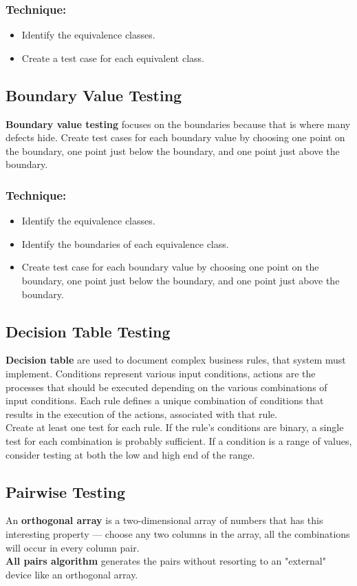 \documentclass{article}
\begin{document}
\subsubsection*{Technique:}
\begin{itemize}
\item Identify the equivalence classes.
\item Create a test case for each equivalent class.
\end{itemize}

\subsection*{Boundary Value Testing}
\textbf{Boundary value testing} focuses on the boundaries because that is where many defects hide. Create test cases for each boundary value by choosing one point on the boundary, one point just below the boundary, and one point just above the boundary.
\subsubsection*{Technique:}
\begin{itemize}
\item Identify the equivalence classes.
\item Identify the boundaries of each equivalence class.
\item Create test case for each boundary value by choosing one point on the boundary, one point just below the boundary, and one point just above the boundary.
\end{itemize}

\subsection*{Decision Table Testing}
\textbf{Decision table} are used to document complex business rules, that system must implement. Conditions represent various input conditions, actions are the processes that should be executed depending on the various combinations of input conditions. Each rule defines a unique combination of conditions that results in the execution of the actions, associated with that rule. 
\\
Create at least one test for each rule. If the rule's conditions are binary, a single test for each combination is probably sufficient. If a condition is a range of values, consider testing at both the low and high end of the range.

\subsection*{Pairwise Testing}
An \textbf{orthogonal array} is a two-dimensional array of numbers that has this interesting property --- choose any two columns in the array, all the combinations will occur in every column pair.
\\
\textbf{All pairs algorithm} generates the pairs without resorting to an "external" device like an orthogonal array.
\end{document}
